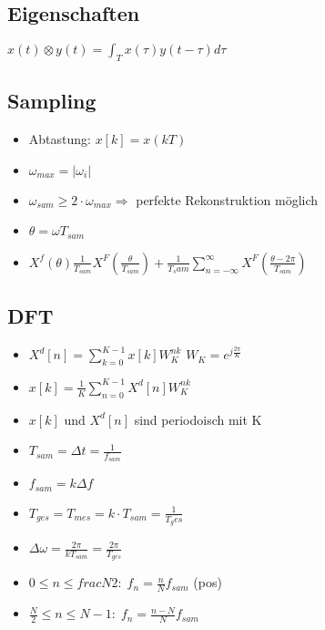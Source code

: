\documentclass{article}
\begin{document}
\subsection{Eigenschaften}
$x(t)\otimes y(t)= \int_T x(\tau)y(t-\tau) d\tau$

\subsection{Sampling}
\begin{itemize}
\item Abtastung: $x[k] = x(kT)$
\item $\omega_{max} = |\omega_i|$
\item $\omega_{sam} \geq 2\cdot \omega_{max} \Rightarrow$ perfekte Rekonstruktion möglich
\item $\theta = \omega T_{sam}$
\item $X^f(\theta) \frac{1}{T_{sam}} X^F(\frac{\theta}{T_{sam}}) + \frac{1}{T_sam} \sum_{n=-\infty}^\infty X^F(\frac{\theta-2\pi}{T_{sam}})$
\end{itemize}

\subsection{DFT}
\begin{itemize}
\item $X^d[n] = \sum_{k=0}^{K-1}x[k]W_K^{nk}$  $W_K=e^{j\frac{2\pi}{K}}$
\item $x[k] = \frac{1}{K} \sum_{n= 0}^{K-1} X^d[n]W_K^{nk}$
\item $x[k]$ und $X^d[n]$ sind periodoisch mit K
\end{itemize}

\begin{itemize}
\item $T_{sam} = \Delta t = \frac{1}{f_{sam}}$
\item $f_{sam} = k \Delta f$
\item $T_{ges} = T_{mes} = k\cdot T_{sam} = \frac{1}{T_ges}$
\item $\Delta \omega = \frac{2\pi}{k T_{sam}} = \frac{2\pi}{T_{ges}}$
\item $0 \leq n \leq frac{N}{2}: \; f_n = \frac{n}{N} f_{sam}$ (pos)
\item $\frac{N}{2} \leq n \leq N-1:\; f_n= \frac{n-N}{N} f_{sam} $
\end{itemize}
\end{document}
